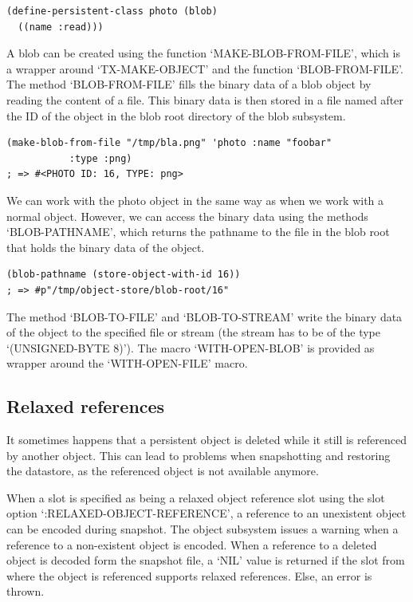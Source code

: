 \begin{Verbatim}[fontsize=\small,frame=leftline,framerule=0.9mm,rulecolor=\color{gray},framesep=5.1mm,xleftmargin=5mm,fontfamily=cmtt]
(define-persistent-class photo (blob)
  ((name :read)))
\end{Verbatim}
A blob can be created using the function `MAKE-BLOB-FROM-FILE',
which is a wrapper around `TX-MAKE-OBJECT' and the function
`BLOB-FROM-FILE'. The method `BLOB-FROM-FILE' fills the binary
data of a blob object by reading the content of a file. This
binary data is then stored in a file named after the ID of the
object in the blob root directory of the blob subsystem.

\begin{Verbatim}[fontsize=\small,frame=leftline,framerule=0.9mm,rulecolor=\color{gray},framesep=5.1mm,xleftmargin=5mm,fontfamily=cmtt]
(make-blob-from-file "/tmp/bla.png" 'photo :name "foobar"
           :type :png)
; => #<PHOTO ID: 16, TYPE: png>
\end{Verbatim}
We can work with the photo object in the same way as when we work
with a normal object. However, we can access the binary data using
the methods `BLOB-PATHNAME', which returns the pathname to the
file in the blob root that holds the binary data of the
object.

\begin{Verbatim}[fontsize=\small,frame=leftline,framerule=0.9mm,rulecolor=\color{gray},framesep=5.1mm,xleftmargin=5mm,fontfamily=cmtt]
(blob-pathname (store-object-with-id 16))
; => #p"/tmp/object-store/blob-root/16"
\end{Verbatim}
The method `BLOB-TO-FILE' and `BLOB-TO-STREAM' write the binary
data of the object to the specified file or stream (the stream has
to be of the type `(UNSIGNED-BYTE 8)'). The macro `WITH-OPEN-BLOB'
is provided as wrapper around the `WITH-OPEN-FILE' macro.


\subsection{ Relaxed references}
It sometimes happens that a persistent object is deleted while it
still is referenced by another object. This can lead to problems
when snapshotting and restoring the datastore, as the referenced
object is not available anymore.

When a slot is specified as being a relaxed object reference slot
using the slot option `:RELAXED-OBJECT-REFERENCE', a reference to
an unexistent object can be encoded during snapshot. The object
subsystem issues a warning when a reference to a non-existent
object is encoded. When a reference to a deleted object is decoded
form the snapshot file, a `NIL' value is returned if the slot from
where the object is referenced supports relaxed references. Else,
an error is thrown.

